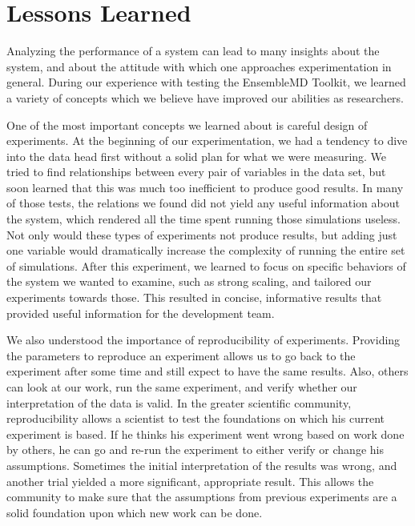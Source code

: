 \documentclass[]{article}
\begin{document}
\section{Lessons Learned}
	Analyzing the performance of a system can lead to many insights about the system, and about the attitude with which one approaches experimentation in general. During our experience with testing the EnsembleMD Toolkit, we learned a variety of concepts which we believe have improved our abilities as researchers.

	One of the most important concepts we learned about is careful design of experiments. At the beginning of our experimentation, we had a tendency to dive into the data head first without a solid plan for what we were measuring. We tried to find relationships between every pair of variables in the data set, but soon learned that this was much too inefficient to produce good results. In many of those tests, the relations we found did not yield any useful information about the system, which rendered all the time spent running those simulations useless. Not only would these types of experiments not produce results, but adding just one variable would dramatically increase the complexity of running the entire set of simulations. After this experiment, we learned to focus on specific behaviors of the system we wanted to examine, such as strong scaling, and tailored our experiments towards those. This resulted in concise, informative results that provided useful information for the development team.

	We also understood the importance of reproducibility of experiments. Providing the parameters to reproduce an experiment allows us to go back to the experiment after some time and still expect to have the same results. Also, others can look at our work, run the same experiment, and verify whether our interpretation of the data is valid. In the greater scientific community, reproducibility allows a scientist to test the foundations on which his current experiment is based. If he thinks his experiment went wrong based on work done by others, he can go and re-run the experiment to either verify or change his assumptions. Sometimes the initial interpretation of the results was wrong, and another trial yielded a more significant, appropriate result. This allows the community to make sure that the assumptions from previous experiments are a solid foundation upon which new work can be done.
\end{document}
